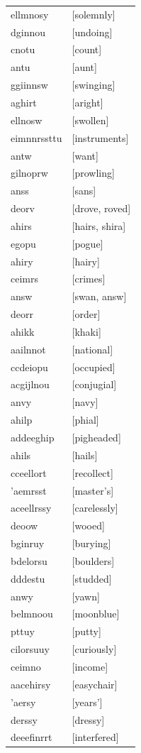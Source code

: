 \documentclass{article}
\begin{document}
\begin{tabular}{ll}
ellmnosy & [solemnly] \\
dginnou & [undoing] \\
cnotu & [count] \\
antu & [aunt] \\
ggiinnsw & [swinging] \\
aghirt & [aright] \\
ellnosw & [swollen] \\
eimnnrssttu & [instruments] \\
antw & [want] \\
gilnoprw & [prowling] \\
anss & [sans] \\
deorv & [drove, roved] \\
ahirs & [hairs, shira] \\
egopu & [pogue] \\
ahiry & [hairy] \\
ceimrs & [crimes] \\
answ & [swan, answ] \\
deorr & [order] \\
ahikk & [khaki] \\
aailnnot & [national] \\
ccdeiopu & [occupied] \\
acgijlnou & [conjugial] \\
anvy & [navy] \\
ahilp & [phial] \\
addeeghip & [pigheaded] \\
ahils & [hails] \\
cceellort & [recollect] \\
'aemrsst & [master's] \\
aceellrssy & [carelessly] \\
deoow & [wooed] \\
bginruy & [burying] \\
bdelorsu & [boulders] \\
dddestu & [studded] \\
anwy & [yawn] \\
belmnoou & [moonblue] \\
pttuy & [putty] \\
cilorsuuy & [curiously] \\
ceimno & [income] \\
aacehirsy & [easychair] \\
'aersy & [years'] \\
derssy & [dressy] \\
deeefinrrt & [interfered] \\

\end{tabular}
\end{document}
